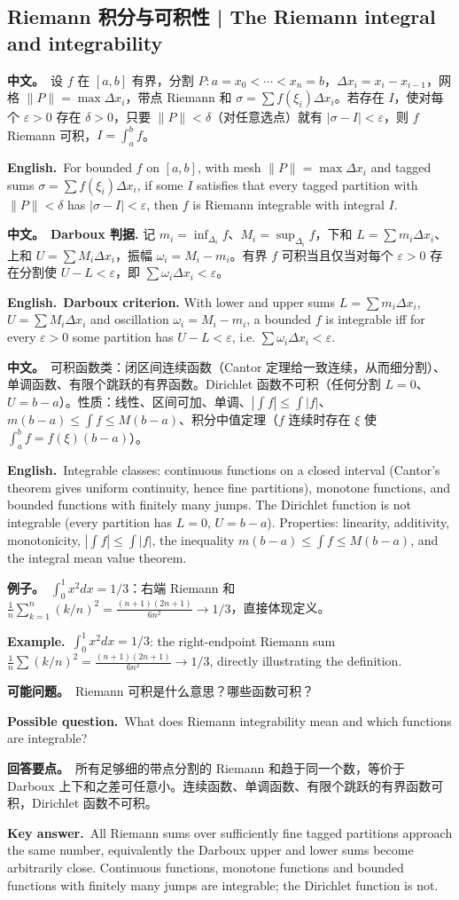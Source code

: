 \documentclass[UTF8,11pt,a4paper]{ctexart}
\newcommand{\BOTH}[2]{\par\noindent\textbf{中文。}\ #1\par\noindent\textbf{English.}\ #2\par}
\newcommand{\EX}[2]{\par\noindent\textbf{例子。}\ #1\par\noindent\textbf{Example.}\ #2\par}
\newcommand{\ASK}[4]{\begin{samepage}\par\noindent\textbf{可能问题。}\ #1\par\noindent\textbf{Possible question.}\ #2\par\noindent\textbf{回答要点。}\ #3\par\noindent\textbf{Key answer.}\ #4\medskip\end{samepage}}
\begin{document}
\subsection{Riemann 积分与可积性 | The Riemann integral and integrability}
\BOTH{设 $f$ 在 $[a,b]$ 有界，分割 $P:a=x_0<\cdots<x_n=b$，$\Delta x_i=x_i-x_{i-1}$，网格 $\|P\|=\max\Delta x_i$，带点 Riemann 和 $\sigma=\sum f(\xi_i)\Delta x_i$。若存在 $I$，使对每个 $\varepsilon>0$ 存在 $\delta>0$，只要 $\|P\|<\delta$（对任意选点）就有 $|\sigma-I|<\varepsilon$，则 $f$ Riemann 可积，$I=\int_a^bf$。}{For bounded $f$ on $[a,b]$, with mesh $\|P\|=\max\Delta x_i$ and tagged sums $\sigma=\sum f(\xi_i)\Delta x_i$, if some $I$ satisfies that every tagged partition with $\|P\|<\delta$ has $|\sigma-I|<\varepsilon$, then $f$ is Riemann integrable with integral $I$.}
\BOTH{\textbf{Darboux 判据.} 记 $m_i=\inf_{\Delta_i}f$、$M_i=\sup_{\Delta_i}f$，下和 $L=\sum m_i\Delta x_i$、上和 $U=\sum M_i\Delta x_i$，振幅 $\omega_i=M_i-m_i$。有界 $f$ 可积当且仅当对每个 $\varepsilon>0$ 存在分割使 $U-L<\varepsilon$，即 $\sum\omega_i\Delta x_i<\varepsilon$。}{\textbf{Darboux criterion.} With lower and upper sums $L=\sum m_i\Delta x_i$, $U=\sum M_i\Delta x_i$ and oscillation $\omega_i=M_i-m_i$, a bounded $f$ is integrable iff for every $\varepsilon>0$ some partition has $U-L<\varepsilon$, i.e. $\sum\omega_i\Delta x_i<\varepsilon$.}
\BOTH{可积函数类：闭区间连续函数（Cantor 定理给一致连续，从而细分割）、单调函数、有限个跳跃的有界函数。Dirichlet 函数不可积（任何分割 $L=0$、$U=b-a$）。性质：线性、区间可加、单调、$|\int f|\le\int|f|$、$m(b-a)\le\int f\le M(b-a)$、积分中值定理（$f$ 连续时存在 $\xi$ 使 $\int_a^bf=f(\xi)(b-a)$）。}{Integrable classes: continuous functions on a closed interval (Cantor's theorem gives uniform continuity, hence fine partitions), monotone functions, and bounded functions with finitely many jumps. The Dirichlet function is not integrable (every partition has $L=0$, $U=b-a$). Properties: linearity, additivity, monotonicity, $|\int f|\le\int|f|$, the inequality $m(b-a)\le\int f\le M(b-a)$, and the integral mean value theorem.}
\EX{$\int_0^1x^2dx=1/3$：右端 Riemann 和 $\frac1n\sum_{k=1}^n(k/n)^2=\frac{(n+1)(2n+1)}{6n^2}\to1/3$，直接体现定义。}{$\int_0^1x^2dx=1/3$: the right-endpoint Riemann sum $\frac1n\sum(k/n)^2=\frac{(n+1)(2n+1)}{6n^2}\to1/3$, directly illustrating the definition.}
\ASK{Riemann 可积是什么意思？哪些函数可积？}{What does Riemann integrability mean and which functions are integrable?}{所有足够细的带点分割的 Riemann 和趋于同一个数，等价于 Darboux 上下和之差可任意小。连续函数、单调函数、有限个跳跃的有界函数可积，Dirichlet 函数不可积。}{All Riemann sums over sufficiently fine tagged partitions approach the same number, equivalently the Darboux upper and lower sums become arbitrarily close. Continuous functions, monotone functions and bounded functions with finitely many jumps are integrable; the Dirichlet function is not.}
\end{document}
